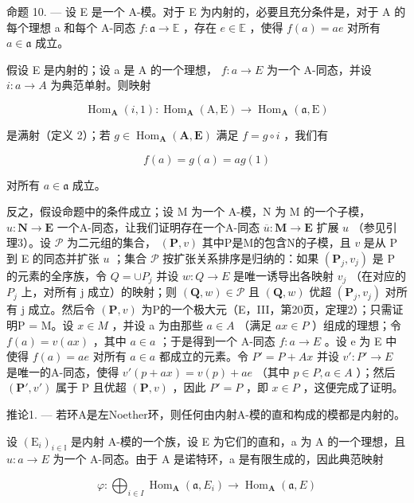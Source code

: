 命题 10. --- 设 E 是一个 A-模。对于 E 为内射的，必要且充分条件是，对于 A 的每个理想 a 和每个 A-同态 \(f: \mathfrak{a} \to \mathbb{E}\) ，存在 \(e \in \mathbb{E}\) ，使得 \(f(a) = ae\) 对所有 \(a \in \mathfrak{a}\) 成立。

假设 E 是内射的；设 a 是 A 的一个理想， \(f : a \to E\) 为一个 A-同态，并设 \(i : a \to A\) 为典范单射。则映射

\[
\operatorname{Hom} _ {\mathbf {A}} (i, 1): \operatorname{Hom} _ {\mathbf {A}} (\mathrm{A}, \mathrm{E}) \rightarrow \operatorname{Hom} _ {\mathbf {A}} (\mathfrak {a}, \mathrm{E})
\]

是满射（定义 2）；若 \(g \in \operatorname{Hom}_{\mathbf{A}}(\mathbf{A}, \mathbf{E})\) 满足 \(f = g \circ i\) ，我们有

\[
f (a) = g (a) = a g (1)
\]

对所有 \(a \in \mathfrak{a}\) 成立。

反之，假设命题中的条件成立；设 M 为一个 A-模，N 为 M 的一个子模， \(u: \mathbf{N} \to \mathbf{E}\) 一个A-同态，让我们证明存在一个A-同态 \(\overline{u}: \mathbf{M} \to \mathbf{E}\) 扩展 \(u\) （参见引理3）。设 \(\mathcal{P}\) 为二元组的集合， \((\mathbf{P}, v)\) 其中P是M的包含N的子模，且 \(v\) 是从 P 到 E 的同态并扩张 \(u\) ；集合 \(\mathcal{P}\) 按扩张关系排序是归纳的：如果 \((\mathbf{P}_{j}, v_{j})\) 是 P 的元素的全序族，令 \(Q = \cup P_{j}\) 并设 \(w : Q \to E\) 是唯一诱导出各映射 \(v_{j}\) （在对应的 \(P_{j}\) 上，对所有 j 成立）的映射；则 \((\mathbf{Q}, w) \in \mathcal{P}\) 且 \((\mathbf{Q}, w)\) 优超 \((\mathbf{P}_{j}, v_{j})\) 对所有 j 成立。然后令 \((\mathbf{P}, v)\) 为P的一个极大元（E，III，第20页，定理2）；只需证明P = M。设 \(x \in M\) ，并设 a 为由那些 \(a \in A\) （满足 \(ax \in P\) ）组成的理想；令 \(f(a) = v(ax)\) ，其中 \(a \in a\) ；于是得到一个 A-同态 \(f : a \to E\) 。设 e 为 E 中使得 \(f(a) = ae\) 对所有 \(a \in a\) 都成立的元素。令 \(P' = P + Ax\) 并设 \(v' : P' \to E\) 是唯一的A-同态，使得 \(v'(p + ax) = v(p) + ae\) （其中 \(p \in P, a \in A\) ）；然后 \((\mathbf{P}', v')\) 属于 P 且优超 \((\mathbf{P}, v)\) ，因此 \(P' = P\) ，即 \(x \in P\) ，这便完成了证明。

推论1. --- 若环A是左Noether环，则任何由内射A-模的直和构成的模都是内射的。

设 \((\mathrm{E}_{i})_{i\in\mathbb{I}}\) 是内射 A-模的一个族，设 E 为它们的直和，a 为 A 的一个理想，且 \(u:a\to E\) 为一个 A-同态。由于 A 是诺特环，a 是有限生成的，因此典范映射

\[
\varphi : \bigoplus_ {i \in I} \operatorname{Hom} _ {\mathbf {A}} (\mathfrak {a}, E _ {i}) \rightarrow \operatorname{Hom} _ {\mathbf {A}} (\mathfrak {a}, E)
\]


